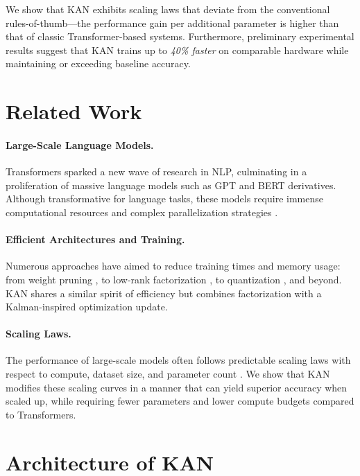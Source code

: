 \documentclass{article}
\begin{document}
We show that KAN exhibits scaling laws that deviate from the conventional rules-of-thumb---the performance gain per additional parameter is higher than that of classic Transformer-based systems. Furthermore, preliminary experimental results suggest that KAN trains up to \emph{40\% faster} on comparable hardware while maintaining or exceeding baseline accuracy.

\section{Related Work}
\label{sec:related_work}

\paragraph{Large-Scale Language Models.}
Transformers \citep{vaswani2017attention} sparked a new wave of research in NLP, culminating in a proliferation of massive language models such as GPT \citep{gpt,gpt2} and BERT \citep{bert} derivatives. Although transformative for language tasks, these models require immense computational resources and complex parallelization strategies \citep{shoeybi2019megatron}.

\paragraph{Efficient Architectures and Training.}
Numerous approaches have aimed to reduce training times and memory usage: from weight pruning \citep{han2015deep}, to low-rank factorization \citep{xu2018benefits}, to quantization \citep{gong2014compressing}, and beyond. KAN shares a similar spirit of efficiency but combines factorization with a Kalman-inspired optimization update.

\paragraph{Scaling Laws.}
The performance of large-scale models often follows predictable scaling laws with respect to compute, dataset size, and parameter count \citep{kaplan2020scaling}. We show that KAN modifies these scaling curves in a manner that can yield superior accuracy when scaled up, while requiring fewer parameters and lower compute budgets compared to Transformers.

\section{Architecture of KAN}
\label{sec:architecture}
\end{document}
